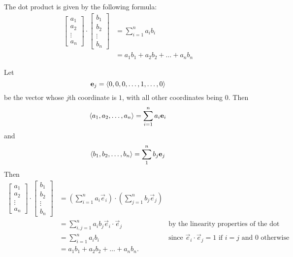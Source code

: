 \documentclass{ximera}
\begin{document}
\begin{theorem}
  The dot product is given by the following formula:
    \begin{align*}
  \begin{bmatrix}
    a_1\\
    a_2\\
    \vdots\\
    a_n
  \end{bmatrix}
  \cdot
  \begin{bmatrix}
    b_1\\
    b_2\\
    \vdots\\
    b_n
  \end{bmatrix}
  &= \sum_{i=1}^n a_ib_i\\
  &= a_1b_1 + a_2b_2 +\dots+a_nb_n
    \end{align*}
\begin{explanation}
  Let 
  \[
  \mathbf{e}_j = \left\langle 0,0,0,\dots,1,\dots,0\right\rangle
  \]	
  be the vector whose $j$th coordinate is $1$, with all other
  coordinates being $0$. Then
  \[ 
  \left\langle a_1,a_2, \dots,a_n\right\rangle = \sum_{i=1}^n a_i \mathbf{e}_i
  \]
  and
  \[ 
  \left\langle b_1,b_2, \dots,b_n\right\rangle = \sum_1^n b_j \mathbf{e}_j
  \]	 
    Then
    \begin{align*}
        \begin{bmatrix}
    a_1\\
    a_2\\
    \vdots\\
    a_n
  \end{bmatrix}
  \cdot
  \begin{bmatrix}
    b_1\\
    b_2\\
    \vdots\\
    b_n
  \end{bmatrix} &= \left(\sum_{i=1}^n a_i \vec{e}_i\right) \cdot \left(\sum_{j=1}^n b_j \vec{e}_j\right)\\
      &=\sum_{i,j =1}^n a_ib_j \vec{e}_i \cdot \vec{e}_j & \text{by the linearity properties of the dot product}\\
      &=\sum_{i=1}^n a_ib_i & \text{since $\vec{e}_i \cdot \vec{e}_j = 1$ if $i=j$ and $0$ otherwise}\\
      &=a_1b_1 + a_2b_2 +\dots+a_nb_n.
    \end{align*}
\end{explanation}
\end{theorem}
\end{document}

